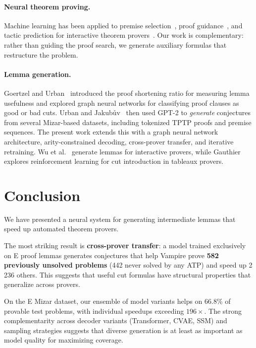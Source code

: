 \documentclass{easychair}
\newcommand{\Eprover}{E\xspace}
\newcommand{\Vampire}{Vampire\xspace}
\newcommand{\Mizar}{Mizar\xspace}
\begin{document}
\paragraph{Neural theorem proving.}
Machine learning has been applied to premise selection~\cite{KaliszykU2015},
proof guidance~\cite{Loos2017,Jakubuv2019,Suda2021,ChvalovskyKPU2023},
and tactic prediction for interactive theorem
provers~\cite{Yang2019}.
Our work is complementary: rather than guiding the proof search, we
generate auxiliary formulas that restructure the problem.

\paragraph{Lemma generation.}
Goertzel and Urban~\cite{Urban2019} introduced the proof shortening
ratio for measuring lemma usefulness and explored graph neural
networks for classifying proof clauses as good or bad cuts.
Urban and Jakub\r{u}v~\cite{Urban2020} then used GPT-2 to
\emph{generate} conjectures from several \Mizar-based datasets,
including tokenized TPTP proofs and premise sequences.  The present work extends this
with a graph neural network architecture, arity-constrained
decoding, cross-prover transfer, and iterative retraining.
Wu et al.~\cite{WuJiangCunha2021} generate lemmas for interactive
provers, while Gauthier~\cite{Gauthier2021} explores reinforcement
learning for cut introduction in tableaux provers.


\section{Conclusion}
\label{sec:conclusion}

We have presented a neural system for generating intermediate lemmas
that speed up automated theorem provers.

The most striking result is \textbf{cross-prover transfer}: a model
trained exclusively on \Eprover proof lemmas generates conjectures
that help \Vampire prove \textbf{582 previously unsolved problems}
(442 never solved by any ATP) and speed up 2\,236 others.
This suggests that useful cut formulas have structural properties
that generalize across provers.

On the \Eprover \Mizar
dataset, our ensemble of model variants helps on 66.8\% of provable
test problems, with individual speedups exceeding $196\times$.  The
strong complementarity across decoder variants (Transformer, CVAE,
SSM) and sampling strategies suggests that diverse generation is at
least as important as model quality for maximizing coverage.
\end{document}
